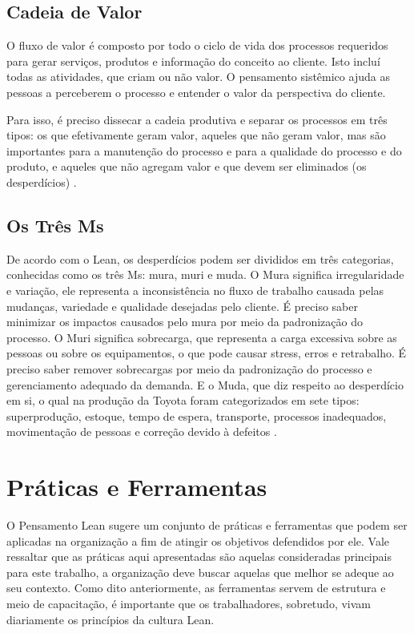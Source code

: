 \begin{anexosenv}
\subsection[Cadeia de Valor]{Cadeia de Valor}

O fluxo de valor é composto por todo o ciclo de vida dos processos requeridos para gerar serviços, produtos e informação do conceito ao cliente.  Isto incluí todas as atividades, que criam ou não valor. O pensamento sistêmico ajuda as pessoas a perceberem o processo e entender o valor da perspectiva do cliente. 

Para isso, é preciso dissecar a cadeia produtiva e separar os processos em três tipos: os que efetivamente geram valor, aqueles que não geram valor, mas são importantes para a manutenção do processo e para a qualidade do processo e do produto, e aqueles que não agregam valor e que devem ser eliminados (os desperdícios) \cite{leaninstitute}.

\subsection[Os Três Ms]{Os Três Ms}

De acordo com o Lean, os desperdícios podem ser divididos em três categorias, conhecidas como os três Ms: mura, muri e muda. O Mura significa irregularidade e variação, ele representa a inconsistência no fluxo de trabalho causada pelas mudanças, variedade e qualidade desejadas pelo cliente. É preciso saber minimizar os impactos causados pelo mura por meio da padronização do processo. O Muri significa sobrecarga, que representa a carga excessiva sobre as pessoas ou sobre os equipamentos, o que pode causar stress, erros e retrabalho. É preciso saber remover sobrecargas por meio da padronização do processo e gerenciamento adequado da demanda. E o Muda, que diz respeito ao desperdício em si, o qual na produção da Toyota foram categorizados em sete tipos: superprodução, estoque, tempo de espera, transporte, processos inadequados, movimentação de pessoas e correção devido à defeitos  \cite{bell2011}.

\section[Práticas e Ferramentas]{Práticas e Ferramentas}

O Pensamento Lean sugere um conjunto de práticas e ferramentas que podem ser aplicadas na organização a fim de atingir os objetivos defendidos por ele. Vale ressaltar que as práticas aqui apresentadas são aquelas consideradas principais para este trabalho, a organização deve buscar aquelas que melhor se adeque ao seu contexto. Como dito anteriormente, as ferramentas servem de estrutura e meio de capacitação, é importante que os trabalhadores, sobretudo, vivam diariamente os princípios da cultura Lean.


\end{anexosenv}
